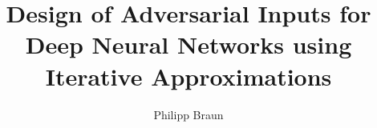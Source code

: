 
\def\titlefontStandardSanSerif{}




\author{Philipp Braun}
\title{Design of Adversarial Inputs for Deep Neural Networks using Iterative Approximations}
\def\titlelineA{Design of Adversarial Inputs for Deep Neural Networks using Iterative Approximations}
\def\titlelineB{Entwurf bösartiger Eingaben für tiefe neuronale Netze \\ mittels iterativer Approximationen}
\def\thesistypegerman{Bachelorarbeit}
\def\thesistype{Bachelor Thesis}
\def\supervisor{M.Sc. Emilio R. Balda} %


